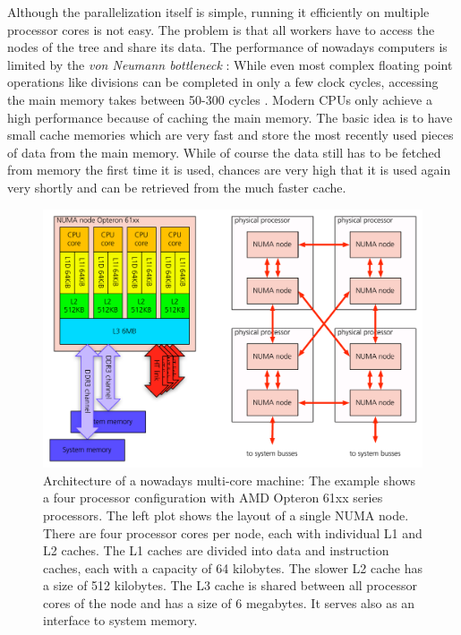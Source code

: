 Although the parallelization itself is simple, running it efficiently on multiple processor cores is not easy. The problem is that all workers have to access the nodes of the tree and share its data. The performance of nowadays computers is limited by the \emph{von Neumann bottleneck} \citep{bryant2010computer}: While even most complex floating point operations like divisions can be completed in only a few clock cycles, accessing the main memory takes between 50-300 cycles \citep{2008WhitepaperFry}. Modern CPUs only achieve a high performance because of caching the main memory. The basic idea is to have small cache memories which are very fast and store the most recently used pieces of data from the main memory. While of course the data still has to be fetched from memory the first time it is used, chances are very high that it is used again very shortly and can be retrieved from the much faster cache. 

\begin{figure}[htbp]
\begin{center}
\includegraphics[scale=0.6]{26algo_magnycours.pdf}
\caption{Architecture of a nowadays multi-core machine: The example shows a four processor configuration with AMD Opteron 61xx series processors. The left plot shows the layout of a single NUMA node. There are four processor cores per node, each with individual L1 and L2 caches. The L1 caches are divided into data and instruction caches, each with a capacity of 64 kilobytes. The slower L2 cache has a size of 512 kilobytes. The L3 cache is shared between all processor cores of the node and has a size of 6 megabytes. It serves also as an interface to system memory. }
\label{ch02_fig26}
\end{center}
\end{figure}

